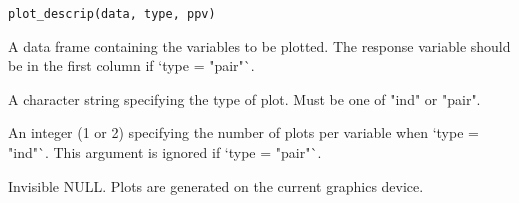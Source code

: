 \documentclass[a4paper]{book}
\begin{document}
%
\begin{Usage}
\begin{verbatim}
plot_descrip(data, type, ppv)
\end{verbatim}
\end{Usage}
%
\begin{Arguments}
\begin{ldescription}
\item[\code{data}] A data frame containing the variables to be plotted. The response
variable should be in the first column if `type = "pair"`.

\item[\code{type}] A character string specifying the type of plot. Must be one of
"ind" or "pair".

\item[\code{ppv}] An integer (1 or 2) specifying the number of plots per variable
when `type = "ind"`. This argument is ignored if `type = "pair"`.
\end{ldescription}
\end{Arguments}
%
\begin{Value}
Invisible NULL. Plots are generated on the current graphics device.
\end{Value}
%
\end{document}
